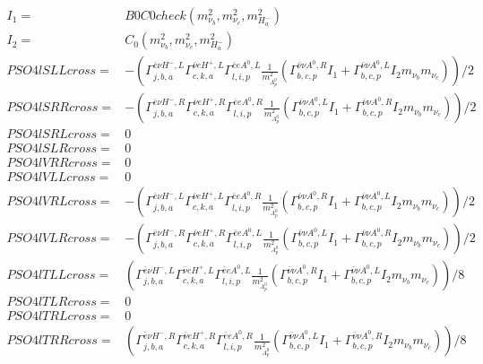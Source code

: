 \documentclass[A4,landscape]{article}
\begin{document}
\begin{align} 
I_1= & B0C0check(m^2_{\nu_{{b}}}, m^2_{\nu_{{c}}}, m^2_{H^-_{{a}}}) \\ 
I_2= & C_0(m^2_{\nu_{{b}}}, m^2_{\nu_{{c}}}, m^2_{H^-_{{a}}}) \\ 
  PSO4lSLLcross= & -( \Gamma^{\bar{e}\nu H^- ,L}_{j, b, a} \Gamma^{\bar{\nu}e H^+,L}_{c, k, a} \Gamma^{\bar{e}e A^0 ,L}_{l, i, p} \frac{1}{m^2_{A^0_{{p}}}} (\Gamma^{\bar{\nu}\nu A^0 ,R}_{b, c, p} I_1 + \Gamma^{\bar{\nu}\nu A^0 ,L}_{b, c, p} I_2 m_{\nu_{{b}}} m_{\nu_{{c}}}))/2 \\ 
  PSO4lSRRcross= & -( \Gamma^{\bar{e}\nu H^- ,R}_{j, b, a} \Gamma^{\bar{\nu}e H^+,R}_{c, k, a} \Gamma^{\bar{e}e A^0 ,R}_{l, i, p} \frac{1}{m^2_{A^0_{{p}}}} (\Gamma^{\bar{\nu}\nu A^0 ,L}_{b, c, p} I_1 + \Gamma^{\bar{\nu}\nu A^0 ,R}_{b, c, p} I_2 m_{\nu_{{b}}} m_{\nu_{{c}}}))/2 \\ 
  PSO4lSRLcross= & 0 \\ 
  PSO4lSLRcross= & 0 \\ 
  PSO4lVRRcross= & 0 \\ 
  PSO4lVLLcross= & 0 \\ 
  PSO4lVRLcross= & -( \Gamma^{\bar{e}\nu H^- ,L}_{j, b, a} \Gamma^{\bar{\nu}e H^+,L}_{c, k, a} \Gamma^{\bar{e}e A^0 ,R}_{l, i, p} \frac{1}{m^2_{A^0_{{p}}}} (\Gamma^{\bar{\nu}\nu A^0 ,R}_{b, c, p} I_1 + \Gamma^{\bar{\nu}\nu A^0 ,L}_{b, c, p} I_2 m_{\nu_{{b}}} m_{\nu_{{c}}}))/2 \\ 
  PSO4lVLRcross= & -( \Gamma^{\bar{e}\nu H^- ,R}_{j, b, a} \Gamma^{\bar{\nu}e H^+,R}_{c, k, a} \Gamma^{\bar{e}e A^0 ,L}_{l, i, p} \frac{1}{m^2_{A^0_{{p}}}} (\Gamma^{\bar{\nu}\nu A^0 ,L}_{b, c, p} I_1 + \Gamma^{\bar{\nu}\nu A^0 ,R}_{b, c, p} I_2 m_{\nu_{{b}}} m_{\nu_{{c}}}))/2 \\ 
  PSO4lTLLcross= & ( \Gamma^{\bar{e}\nu H^- ,L}_{j, b, a} \Gamma^{\bar{\nu}e H^+,L}_{c, k, a} \Gamma^{\bar{e}e A^0 ,L}_{l, i, p} \frac{1}{m^2_{A^0_{{p}}}} (\Gamma^{\bar{\nu}\nu A^0 ,R}_{b, c, p} I_1 + \Gamma^{\bar{\nu}\nu A^0 ,L}_{b, c, p} I_2 m_{\nu_{{b}}} m_{\nu_{{c}}}))/8 \\ 
  PSO4lTLRcross= & 0 \\ 
  PSO4lTRLcross= & 0 \\ 
  PSO4lTRRcross= & ( \Gamma^{\bar{e}\nu H^- ,R}_{j, b, a} \Gamma^{\bar{\nu}e H^+,R}_{c, k, a} \Gamma^{\bar{e}e A^0 ,R}_{l, i, p} \frac{1}{m^2_{A^0_{{p}}}} (\Gamma^{\bar{\nu}\nu A^0 ,L}_{b, c, p} I_1 + \Gamma^{\bar{\nu}\nu A^0 ,R}_{b, c, p} I_2 m_{\nu_{{b}}} m_{\nu_{{c}}}))/8 \\ 
\end{align} 
\end{document}
